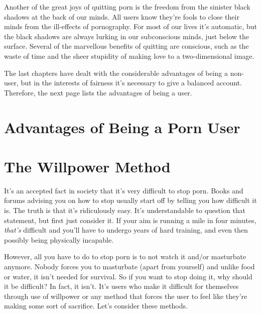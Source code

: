 \documentclass[
]{book}
\begin{document}
Another of the great joys of quitting porn is the freedom from the sinister black shadows at the back of our minds. All users know they're fools to close their minds from the ill-effects of pornography. For most of our lives it's automatic, but the black shadows are always lurking in our subconscious minds, just below the surface. Several of the marvellous benefits of quitting are conscious, such as the waste of time and the sheer stupidity of making love to a two-dimensional image.

The last chapters have dealt with the considerable advantages of being a non-user, but in the interests of fairness it's necessary to give a balanced account. Therefore, the next page lists the advantages of being a user.

\hypertarget{advantages-of-being-a-porn-user}{%
\chapter{Advantages of Being a Porn User}\label{advantages-of-being-a-porn-user}}

\hypertarget{the-willpower-method-1}{%
\chapter{The Willpower Method}\label{the-willpower-method-1}}

It's an accepted fact in society that it's very difficult to stop porn. Books and forums advising you on how to stop usually start off by telling you how difficult it is. The truth is that it's ridiculously easy. It's understandable to question that statement, but first just consider it. If your aim is running a mile in four minutes, \emph{that's} difficult and you'll have to undergo years of hard training, and even then possibly being physically incapable.

However, all you have to do to stop porn is to not watch it and/or masturbate anymore. Nobody forces you to masturbate (apart from yourself) and unlike food or water, it isn't needed for survival. So if you want to stop doing it, why should it be difficult? In fact, it isn't. It's users who make it difficult for themselves through use of willpower or any method that forces the user to feel like they're making some sort of sacrifice. Let's consider these methods.
\end{document}
